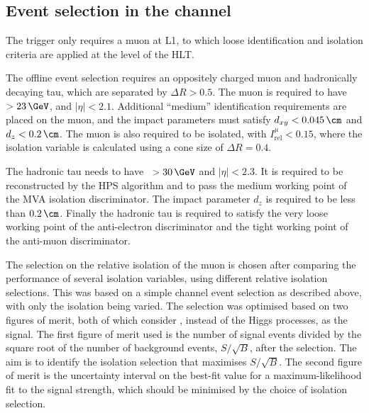 \subsection{\texorpdfstring{Event selection in the \mutau channel}{Event selection in the mu tau channel}}
\label{sec:mssm_eventsel_mt}
The trigger only requires a muon at \ac{L1}, to which loose identification and
isolation criteria are applied at the level of the \ac{HLT}.

The offline event selection requires an oppositely charged
muon and hadronically decaying tau, which are separated by $\Delta R > 0.5$.
The muon is required to have \pT~$> 23\,\GeV$, and $|\eta| < 2.1$. %
Additional ``medium'' identification requirements are placed on the muon, and the impact
parameters must satisfy $d_{xy}<0.045\,\cm$ and $d_{z}<0.2\,\cm$. The muon is also
required to be isolated, with $I_{\text{rel}}^{\mu}<0.15$, where the isolation variable
is calculated using a cone size of $\Delta R = 0.4$.

The hadronic tau needs to have \pT~$>30\,\GeV$ and $|\eta|<2.3$.
It is required to be reconstructed by the HPS algorithm and to pass the medium
working point of the MVA isolation discriminator. The impact parameter $d_{z}$ is
required to be less than $0.2\,\cm$. Finally the hadronic tau is required
to satisfy the very loose working point of the anti-electron discriminator
and the tight working point of the anti-muon discriminator.

The selection on the relative isolation of the muon is chosen after comparing
the performance of several isolation variables, using different relative isolation selections.
This was based on a simple \mutau channel
event selection as described above, with only the isolation being varied.
The selection was optimised based on two figures of merit, both of
which consider \Ztautau, instead of the Higgs processes, as the signal.
The first figure of merit used is the number of signal events divided by the
square root of the number of background events, $S/\sqrt{B}$, after
the selection. The aim is to identify 
the isolation selection that maximises $S/\sqrt{B}$. The second figure of merit
is the uncertainty interval on the best-fit value for a maximum-likelihood fit
to the \Ztautau signal strength, which should be minimised by the choice of
isolation selection.

